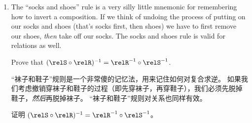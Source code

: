 \begin{enumerate}
    \wbvfill
    
    \rule{0pt}{0pt}
    
    \wbvfill
    
    \workbookpagebreak
    
    
    \item The ``socks and shoes'' rule is a very silly little mnemonic
    for remembering how to invert a composition.
    If we think of undoing
    the process of putting on our socks and shoes (that's socks first, then
    shoes) we have to first remove our shoes, \emph{then} take off our socks.
    The socks and shoes rule is valid for relations as well.
    
    Prove that $(\relS \circ \relR)^{-1} = \relR^{-1} \circ \relS^{-1}$.
    
    \noindent  “袜子和鞋子”规则是一个非常傻的记忆法，用来记住如何对复合求逆。
    如果我们考虑撤销穿袜子和鞋子的过程（即先穿袜子，再穿鞋子），我们必须先脱掉鞋子，\emph{然后}再脱掉袜子。
    “袜子和鞋子”规则对关系也同样有效。
    
    证明 $(\relS \circ \relR)^{-1} = \relR^{-1} \circ \relS^{-1}$。
    
    \wbvfill
    
    \workbookpagebreak
    
    \end{enumerate} 
    
